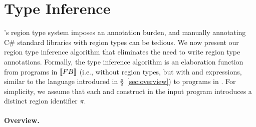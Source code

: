 \newcommand{\deltaPC}{\Delta_P^C}

\newcommand{\soln}{\eta}
\newcommand{\solnR}{\soln_R}
\newcommand{\solnP}{\soln_P}
\newcommand{\thesoln}{\hat{\eta}}
\newcommand{\thesolnR}{\thesoln_R}
\newcommand{\thesolnP}{\thesoln_P}

\newcommand{\saturate}[1]{{#1}^*}
\newcommand{\myground}[1]{\saturate{#1}_g}
\newcommand{\consOf}[1]{\textsc{GenConstraint}(#1)}
\newcommand{\satC}{\saturate{C}}
\newcommand{\groundC}{\myground{C}}
\newcommand{\rhoC}{\text{WF}_R}
\newcommand{\solveCon}[1]{\textsc{Solve}(#1)}

\section{Type Inference}
\label{sec:type-inference}

\name's region type system imposes an annotation burden, and
manually annotating C\# standard libraries with region types
can be tedious. We now present our region type inference algorithm
that eliminates the need to write region type annotations.
Formally, the type inference
algorithm is an elaboration function from programs in $\llbracket {\sc FB} \rrbracket$
(i.e., \FB without region types, but with  and 
expressions, similar to the language introduced in
\S~\ref{sec:overview}) to programs in \FB.
For simplicity, we assume that each  and  construct
in the input program introduces a distinct region identifier $\pi$.

\paragraph{Overview.}

